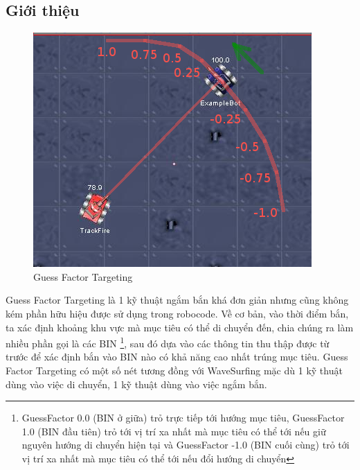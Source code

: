 \documentclass[14pt]{article}
\begin{document}
\subsection{Giới thiệu}
\begin{figure}[H]
\centering
\includegraphics[scale=0.5]{images/GuessFactors.png}
\caption{Guess Factor Targeting}
\end{figure}
Guess Factor Targeting là 1 kỹ thuật ngắm bắn khá đơn giản nhưng cũng không kém phần hữu hiệu được sử dụng trong robocode.
Về cơ bản, vào thời điểm bắn, ta xác định khoảng khu vực mà mục tiêu có thể di chuyển đến, chia chúng ra làm nhiều phần gọi là các BIN \footnote{GuessFactor 0.0 (BIN ở giữa) trỏ trực tiếp tới hướng mục tiêu, GuessFactor 1.0 (BIN đầu tiên) trỏ tới vị trí xa nhất mà mục tiêu có thể tới nếu giữ nguyên hướng di chuyển hiện tại và GuessFactor -1.0 (BIN cuối cùng) trỏ tới vị trí xa nhất mà mục tiêu có thể tới nếu đổi hướng di chuyển}, sau đó dựa vào các thông tin thu thập được từ trước để xác định bắn vào BIN nào có khả năng cao nhất trúng mục tiêu.
Guess Factor Targeting có một số nét tương đồng với WaveSurfing mặc dù 1 kỹ thuật dùng vào việc di chuyển, 1 kỹ thuật dùng vào việc ngắm bắn.
\end{document}
